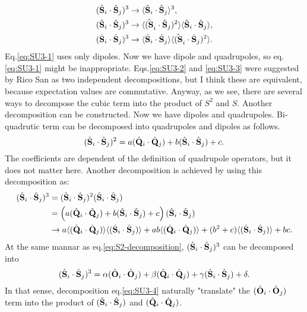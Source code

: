 \documentclass[11pt, aps, longbibliography]{article}
\begin{document}
\begin{align}
    (\hat{\bold{S}}_i \cdot \hat{\bold{S}}_j)^3 &\rightarrow \langle \hat{\bold{S}}_i \cdot \hat{\bold{S}}_j \rangle^3,  \label{eq:SU3-1} \\
    (\hat{\bold{S}}_i \cdot \hat{\bold{S}}_j)^3 &\rightarrow \langle \hat{(\bold{S}}_i \cdot \hat{\bold{S}}_j)^2 \rangle \langle \hat{\bold{S}}_i \cdot \hat{\bold{S}}_j \rangle,  \label{eq:SU3-2} \\
    (\hat{\bold{S}}_i \cdot \hat{\bold{S}}_j)^3 &\rightarrow \langle \hat{\bold{S}}_i \cdot \hat{\bold{S}}_j \rangle \langle \hat{(\bold{S}}_i \cdot \hat{\bold{S}}_j)^2 \rangle.  \label{eq:SU3-3} \\
\end{align}
Eq.\eqref{eq:SU3-1} uses only dipoles. Now we have dipole and quadrupoles, so eq.\eqref{eq:SU3-1} might be inappropriate.
Eqs.\eqref{eq:SU3-2} and \eqref{eq:SU3-3} were suggested by Rico San as two independent decompositions, but I think these are equivalent, 
because expectation values are commutative.
Anyway, as we see, there are several ways to decompose the cubic term into the product of $S^2$ and $S$.
Another decomposition can be constructed. Now we have dipoles and quadrupoles. Bi-quadrutic term can be decomposed into quadrupoles and dipoles as follows.
\begin{equation}
    (\hat{\bold{S}}_i \cdot \hat{\bold{S}}_j)^2 = a(\hat{\bold{Q}}_i \cdot \hat{\bold{Q}}_j) + b(\hat{\bold{S}}_i \cdot \hat{\bold{S}}_j) + c. \label{eq:S2-decomposition}
\end{equation}
The coefficients are dependent of the definition of quadrupole operators, but it does not matter here.
Another decomposition is achieved by using this decomposition as:
\begin{align}
    (\hat{\bold{S}}_i \cdot \hat{\bold{S}}_j)^3 &= (\hat{\bold{S}}_i \cdot \hat{\bold{S}}_j)^2 (\hat{\bold{S}}_i \cdot \hat{\bold{S}}_j) \\
    &= \left( a(\hat{\bold{Q}}_i \cdot \hat{\bold{Q}}_j) + b(\hat{\bold{S}}_i \cdot \hat{\bold{S}}_j) + c \right)(\hat{\bold{S}}_i \cdot \hat{\bold{S}}_j) \\
    &\rightarrow a\langle(\hat{\bold{Q}}_i \cdot \hat{\bold{Q}}_j)\rangle\langle(\hat{\bold{S}}_i \cdot \hat{\bold{S}}_j)\rangle + ab\langle (\hat{\bold{Q}}_i \cdot \hat{\bold{Q}}_j) \rangle + (b^2+c) \langle (\hat{\bold{S}}_i \cdot \hat{\bold{S}}_j) \rangle + bc. \label{eq:SU3-4}
\end{align}
At the same mannar as eq.\eqref{eq:S2-decomposition}, $(\hat{\bold{S}}_i \cdot \hat{\bold{S}}_j)^3$ can be decomposed into 
\begin{equation}
    (\hat{\bold{S}}_i \cdot \hat{\bold{S}}_j)^3 = \alpha(\hat{\bold{O}}_i \cdot \hat{\bold{O}}_j) + \beta(\hat{\bold{Q}}_i \cdot \hat{\bold{Q}}_j) + \gamma(\hat{\bold{S}}_i \cdot \hat{\bold{S}}_j) + \delta .\label{eq:S2-decomposition}
\end{equation}
In that sense, decomposition eq.\eqref{eq:SU3-4} naturally "translate" the $(\hat{\bold{O}}_i \cdot \hat{\bold{O}}_j)$ term into the product of $(\hat{\bold{S}}_i \cdot \hat{\bold{S}}_j)$ and $(\hat{\bold{Q}}_i \cdot \hat{\bold{Q}}_j)$.
\end{document}
